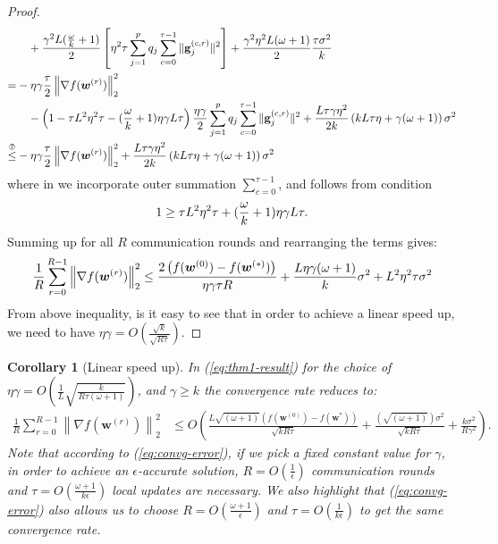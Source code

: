 \documentclass[twoside]{article}
\newtheorem{corollary}{Corollary}
\begin{document}
\begin{proof}
\begin{align}
     &\quad+\frac{\gamma^2 L(\frac{\omega}{k}+1)}{2}\left[{\eta^2\tau}\sum_{j=1}^pq_j\sum_{c=0}^{\tau-1}\|\mathbf{g}^{(c,r)}_{j}\|^2\right]+\frac{\gamma^2\eta^2 L(\omega+1)}{2}\frac{\tau \sigma^2}{k}\nonumber\\
     =&-\eta\gamma\frac{\tau}{2}\left\|\nabla f({\boldsymbol{w}}^{(r)})\right\|_2^2\nonumber\\
     &\quad-\left(1-{\tau L^2\eta^2\tau}-{(\frac{\omega}{k}+1)\eta\gamma L}{\tau}\right)\frac{\eta\gamma}{2}\sum_{j=1}^pq_j\sum_{c=0}^{\tau-1}\|\mathbf{g}^{(c,r)}_{j}\|^2+\frac{L\tau\gamma\eta^2 }{2k}\left(kL\tau\eta+\gamma(\omega+1)\right)\sigma^2\nonumber\\
     \stackrel{\text{\ding{193}}}{\leq}& -\eta\gamma\frac{\tau}{2}\left\|\nabla f({\boldsymbol{w}}^{(r)})\right\|_2^2+\frac{L\tau\gamma\eta^2 }{2k}\left(kL\tau\eta+\gamma(\omega+1)\right)\sigma^2\label{eq:finalll}
\end{align}
where in  we incorporate outer summation $\sum_{c=0}^{\tau-1}$, and   follows from condition 
\begin{align}\notag
   1\geq {\tau L^2\eta^2\tau}+(\frac{\omega}{k}+1)\eta\gamma L{\tau}. 
\end{align}
Summing up for all $R$ communication rounds and  rearranging the terms gives:
\begin{align}\notag
    \frac{1}{R}\sum_{r=0}^{R-1}\left\|\nabla f({\boldsymbol{w}}^{(r)})\right\|_2^2\leq \frac{2\left(f(\boldsymbol{w}^{(0)})-f(\boldsymbol{w}^{(*)})\right)}{\eta\gamma\tau R}+\frac{L\eta\gamma{(\omega+1)}}{k}\sigma^2+{L^2\eta^2\tau }\sigma^2
\end{align}
From above inequality, is it easy to see that in order to achieve a linear speed up, we need to have $\eta\gamma=O\left(\frac{\sqrt{k}}{\sqrt{R \tau}}\right)$.
\end{proof}


\begin{corollary}[Linear speed up] 
In (\ref{eq:thm1-result}) for the choice of  $\eta\gamma=O\left(\frac{1}{L}\sqrt{\frac{k}{R\tau\left(\omega+1\right)}}\right)$, and $\gamma\geq k$  the  convergence rate reduces to:
\begin{align}
    \frac{1}{R}\sum_{r=0}^{R-1}\left\|\nabla f({\boldsymbol{w}}^{(r)})\right\|_2^2&\leq O\left(\frac{L\sqrt{\left(\omega+1\right)}\left(f(\boldsymbol{w}^{(0)})-f(\boldsymbol{w}^{*})\right)}{\sqrt{kR\tau}}+\frac{\left(\sqrt{\left(\omega+1\right)}\right)\sigma^2}{\sqrt{kR\tau}}+\frac{k\sigma^2}{R\gamma^2}\right).\label{eq:convg-error}
\end{align}
Note that according to (\ref{eq:convg-error}), if we pick  a fixed constant value for  $\gamma$, in order to achieve an $\epsilon$-accurate solution, $R=O\left(\frac{1}{\epsilon}\right)$ communication rounds and $\tau=O\left(\frac{\omega+1}{k\epsilon}\right)$ local updates are necessary. We also highlight  that (\ref{eq:convg-error}) also allows us to choose $R=O\left(\frac{\omega+1}{\epsilon}\right)$ and $\tau=O\left(\frac{1}{k\epsilon}\right)$ to get the  same convergence rate.
\end{corollary}
\end{document}
